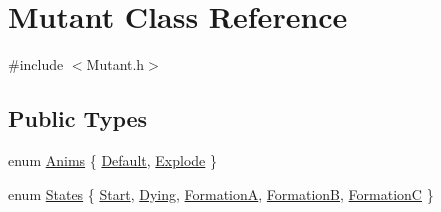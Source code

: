 \hypertarget{class_mutant}{}\section{Mutant Class Reference}
\label{class_mutant}


{\ttfamily \#include $<$Mutant.\+h$>$}

\subsection*{Public Types}
\begin{DoxyCompactItemize}
\item 
enum \hyperlink{class_mutant_a0b6d537f129ebc093f65e745a25eaf6a}{Anims} \{ \hyperlink{class_mutant_a0b6d537f129ebc093f65e745a25eaf6aa73a5536e612268909b171724bbb2a002}{Default}, 
\hyperlink{class_mutant_a0b6d537f129ebc093f65e745a25eaf6aa1883289f1eacf499d4142bf779202949}{Explode}
 \}
\item 
enum \hyperlink{class_mutant_a508d3c9d254807091259a620bbf77209}{States} \{ \newline
\hyperlink{class_mutant_a508d3c9d254807091259a620bbf77209a8d0b9823bfe10057d91ac5222ef86bfc}{Start}, 
\hyperlink{class_mutant_a508d3c9d254807091259a620bbf77209ae11da7182d95dacee973bbb21c0693ad}{Dying}, 
\hyperlink{class_mutant_a508d3c9d254807091259a620bbf77209a7fab13c7c339486920f8372a69f1e541}{FormationA}, 
\hyperlink{class_mutant_a508d3c9d254807091259a620bbf77209af42129159ef9e4228065426e0db479e7}{FormationB}, 
\newline
\hyperlink{class_mutant_a508d3c9d254807091259a620bbf77209ae5caa138a87f21ff544dac38f1475eb5}{FormationC}
 \}
\end{DoxyCompactItemize}
